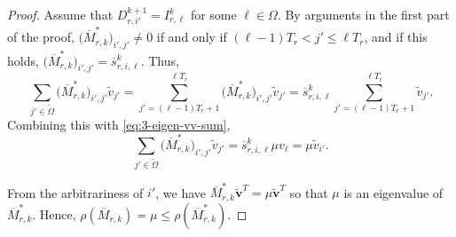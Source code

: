 \documentclass[10pt,a4paper]{amsart}
\def\wdt{\widetilde}
\newcommand{\bfv}{{\mathbf v}}
\newcommand{\upM}{{\overline{M}}}
\newcommand{\ups}{{\overline{s} }}
\begin{document}
\begin{proof}
Assume that $D_{r,i'}^{k+1}=I_{r,\ell}^k$ for some $\ell\in \Omega$. By arguments in the first part of the proof, $\big(\upM_{r,k}^*\big)_{i',j'}\not=0$ if and only if $(\ell-1)T_r<j'\leq \ell T_r$, and if this holds, $\big(\upM_{r,k}^*\big)_{i',j'}=\ups_{r,i,\ell}^k$. Thus,
\[
\sum_{j'\in \wdt{\Omega}} \big(\upM_{r,k}^*\big)_{i',j'} \wdt{v}_{j'}=\sum_{j'=(\ell-1)T_r+1}^{\ell T_r} \big(\upM_{r,k}^*\big)_{i',j'} \wdt{v}_{j'}=\ups_{r,i,\ell}^k \sum_{j'=(\ell-1)T_r+1}^{ \ell T_r }  \wdt{v}_{j'}. 
\]
Combining this with \eqref{eq:3-eigen-vv-sum}, 
\[
\sum_{j'\in \wdt{\Omega}} \big(\upM_{r,k}^*\big)_{i',j'} \wdt{v}_{j'}=\ups_{r,i,\ell}^k \mu v_{\ell}=\mu \wdt{v}_{i'}.
\]

From the arbitrariness of $i'$, we have $\upM_{r,k}^*  \wdt{\bfv}^T =\mu \wdt{\bfv}^T$ so that $\mu$ is an eigenvalue of $\upM_{r,k}^*$. Hence, 
$\rho(\upM_{r,k})=\mu\leq \rho(\upM_{r,k}^*)$.
\end{proof}	
\end{document}
